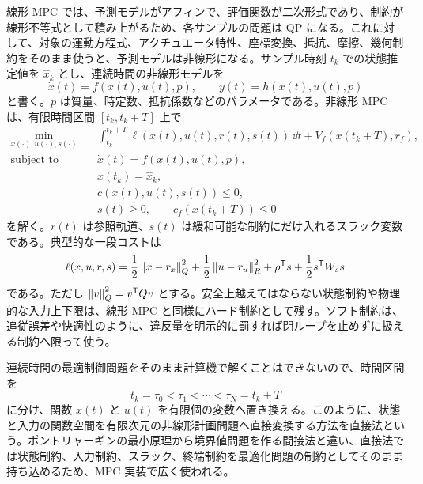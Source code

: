 線形 MPC では、予測モデルがアフィンで、評価関数が二次形式であり、制約が線形不等式として積み上がるため、各サンプルの問題は QP になる。これに対して、対象の運動方程式、アクチュエータ特性、座標変換、抵抗、摩擦、幾何制約をそのまま使うと、予測モデルは非線形になる。サンプル時刻 $t_k$ での状態推定値を $\hat{x}_k$ とし、連続時間の非線形モデルを
\begin{equation}
  \dot{x}(t)=f(x(t),u(t),p),
  \qquad
  y(t)=h(x(t),u(t),p)
\end{equation}
と書く。$p$ は質量、時定数、抵抗係数などのパラメータである。非線形 MPC は、有限時間区間 $[t_k,t_k+T]$ 上で
\begin{align}
  \min_{x(\cdot),u(\cdot),s(\cdot)}\quad &
  \int_{t_k}^{t_k+T}
  \ell(x(t),u(t),r(t),s(t))\,\dd t
  +V_f(x(t_k+T),r_f),\\
  \text{subject to}\quad &
  \dot{x}(t)=f(x(t),u(t),p),\\
  &x(t_k)=\hat{x}_k,\\
  &c(x(t),u(t),s(t))\le0,\\
  &s(t)\ge0,\qquad
  c_f(x(t_k+T))\le0
\end{align}
を解く。$r(t)$ は参照軌道、$s(t)$ は緩和可能な制約にだけ入れるスラック変数である。典型的な一段コストは
\begin{equation}
  \ell(x,u,r,s)
  =\frac{1}{2}\left\|x-r_x\right\|_{Q}^{2}
  +\frac{1}{2}\left\|u-r_u\right\|_{R}^{2}
  +\rho^{\mathsf{T}} s+\frac{1}{2}s^{\mathsf{T}} W_s s
\end{equation}
である。ただし $\left\|v\right\|_{Q}^{2}=v^{\mathsf{T}} Qv$ とする。安全上越えてはならない状態制約や物理的な入力上下限は、線形 MPC と同様にハード制約として残す。ソフト制約は、追従誤差や快適性のように、違反量を明示的に罰すれば閉ループを止めずに扱える制約へ限って使う。

連続時間の最適制御問題をそのまま計算機で解くことはできないので、時間区間を
\begin{equation}
  t_k=\tau_0<\tau_1<\cdots<\tau_N=t_k+T
\end{equation}
に分け、関数 $x(t)$ と $u(t)$ を有限個の変数へ置き換える。このように、状態と入力の関数空間を有限次元の非線形計画問題へ直接変換する方法を直接法という。ポントリャーギンの最小原理から境界値問題を作る間接法と違い、直接法では状態制約、入力制約、スラック、終端制約を最適化問題の制約としてそのまま持ち込めるため、MPC 実装で広く使われる。

